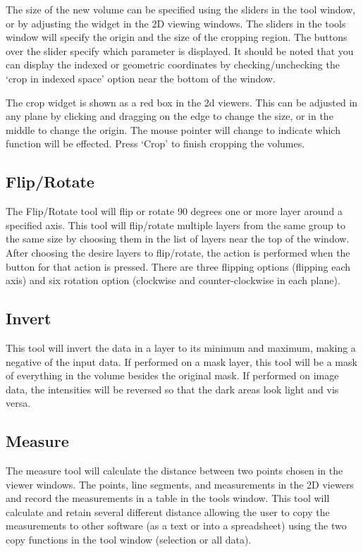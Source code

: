 \documentclass[fleqn,11pt,openany]{book}
\begin{document}
The size of the new volume can be specified using the sliders in the tool window, or by adjusting the widget in the 2D viewing windows.   The sliders in the tools window will specify the origin and the size of the cropping region.  The buttons over the slider specify which parameter is displayed. It should be noted that you can display the indexed or geometric coordinates by checking/unchecking the `crop in indexed space' option near the bottom of the window.  

The crop widget is shown as a red box in the 2d viewers.  This can be adjusted in any plane by clicking and dragging on the edge to change the size, or in the middle to change the origin.  The mouse pointer will change to indicate which function will be effected.  Press `Crop' to finish cropping the volumes.

\subsection{Flip/Rotate}

The Flip/Rotate tool will flip or rotate 90 degrees one or more layer around a specified axis.  This tool will flip/rotate multiple layers from the same group to the same size  by choosing them in the list of layers near the top of the window.  After choosing the desire layers to flip/rotate, the action is performed when the button for that action is pressed.  There are three flipping options (flipping each axis) and six rotation option (clockwise and counter-clockwise in each plane).  

\subsection{Invert}

This tool will invert the data in a layer to its minimum and maximum, making a negative of the input data.  If performed on a mask layer, this tool will be a mask of everything in the volume besides the original mask.  If performed on image data, the intensities will be reversed so that the dark areas look light and vis versa.

\subsection{Measure}

The measure tool will calculate the distance between two points chosen in the viewer windows.  The points, line segments, and measurements in the 2D viewers and record the measurements in a table in the tools window.   This tool will calculate and retain several different distance allowing the user to copy the measurements to other software (as a text or into a spreadsheet) using the two copy functions in the tool window (selection or all data).  
\end{document}
